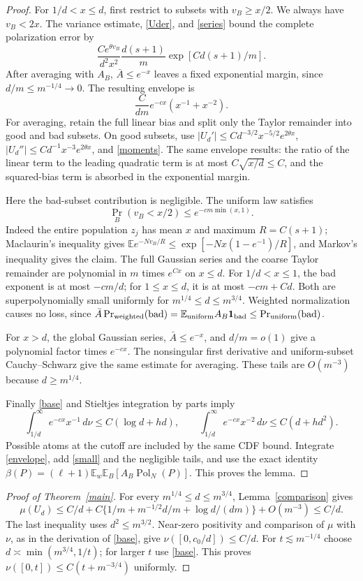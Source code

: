 \documentclass[11pt]{article}
\newcommand{\E}{\mathbb E}
\newcommand{\Pol}{\operatorname{Pol}}
\begin{document}
\begin{proof}
For $1/d<x\le d$, first restrict to subsets with $v_B\ge x/2$.
We always have $v_B<2x$. The variance estimate, \eqref{Uder}, and
\eqref{series} bound the complete polarization error by
\[
 \frac{C e^{\theta v_B}}{d^2x^2}
       \frac{d(s+1)}m\exp[Cd(s+1)/m].
\]
After averaging with $A_B$, $\bar A\le e^{-x}$ leaves a fixed
exponential margin, since $d/m\le m^{-1/4}\to0$.
The resulting envelope is
\begin{equation}\label{envelope}
 \frac C{dm}e^{-cx}(x^{-1}+x^{-2}).
\end{equation}
For averaging, retain the full linear bias and split only the Taylor
remainder into good and bad subsets. On good subsets, use
$|U_d'|\le C d^{-3/2}x^{-5/2}e^{2\theta x}$,
$|U_d''|\le C d^{-1}x^{-3}e^{2\theta x}$, and \eqref{moments}.
The same envelope results: the ratio of the linear term to the
leading quadratic term is at most $C\sqrt{x/d}\le C$, and the
squared-bias term is absorbed in the exponential margin.

Here the bad-subset contribution is negligible. The uniform law
satisfies
\[
 \Pr_B(v_B<x/2)\le e^{-cm\min(x,1)}.
\]
Indeed the entire population $z_j$ has mean $x$ and maximum
$R=C(s+1)$; Maclaurin's inequality gives
$\E e^{-Nv_B/R}\le\exp[-Nx(1-e^{-1})/R]$, and Markov's inequality
gives the claim. The full Gaussian series and the coarse Taylor
remainder are polynomial in $m$ times $e^{Cx}$ on $x\le d$.
For $1/d<x\le1$, the bad exponent is at most $-cm/d$; for
$1\le x\le d$, it is at most $-cm+Cd$. Both are superpolynomially
small uniformly for $m^{1/4}\le d\le m^{3/4}$.
Weighted normalization causes no loss, since
$\bar A\Pr_{\rm weighted}(\mathrm{bad})
=\E_{\rm uniform}A_B\boldsymbol1_{\rm bad}
\le\Pr_{\rm uniform}(\mathrm{bad})$.

For $x>d$, the global Gaussian series, $\bar A\le e^{-x}$, and
$d/m=o(1)$ give a polynomial factor times $e^{-cx}$.
The nonsingular first derivative and uniform-subset Cauchy--Schwarz
give the same estimate for averaging. These tails are $O(m^{-3})$
because $d\ge m^{1/4}$.

Finally \eqref{base} and Stieltjes integration by parts imply
\[
 \int_{1/d}^\infty e^{-cx}x^{-1}\,d\nu\le C(\log d+hd),\qquad
 \int_{1/d}^\infty e^{-cx}x^{-2}\,d\nu\le C(d+hd^2).
\]
Possible atoms at the cutoff are included by the same CDF bound.
Integrate \eqref{envelope}, add \eqref{small} and the negligible tails,
and use the exact identity
$\beta(P)=(\ell+1)\E_w\E_B[A_B\Pol_N(P)]$.
This proves the lemma.
\end{proof}

\begin{proof}[Proof of Theorem~\ref{main}]
For every $m^{1/4}\le d\le m^{3/4}$, Lemma~\ref{comparison} gives
\[
 \mu(U_d)\le C/d+C\{1/m+m^{-1/2}d/m+\log d/(dm)\}
                   +O(m^{-3})\le C/d.
\]
The last inequality uses $d^2\le m^{3/2}$.
Near-zero positivity and comparison of $\mu$ with $\nu$, as in the
derivation of \eqref{base}, give $\nu([0,c_0/d])\le C/d$.
For $t\lesssim m^{-1/4}$ choose
$d\asymp\min(m^{3/4},1/t)$; for larger $t$ use \eqref{base}.
This proves $\nu([0,t])\le C(t+m^{-3/4})$ uniformly.
\end{proof}
\end{document}
